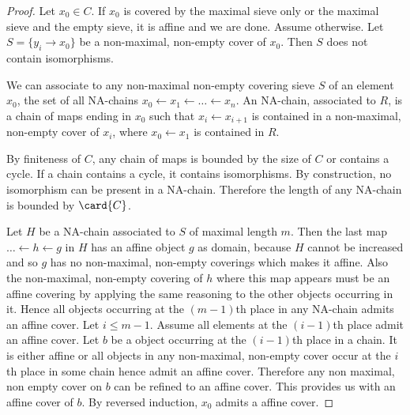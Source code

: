 \begin{proof}
Let $x_0\in C$. 
If $x_0$ is covered by the maximal sieve only or the maximal sieve and the empty sieve, it is affine and we are done. 
Assume otherwise.
Let $S = \{y_i \rightarrow x_0\}$ be a non-maximal, non-empty cover of $x_0$.
Then $S$ does not contain isomorphisms.

We can associate to any non-maximal non-empty covering sieve $S$ of an element $x_0$,
the set of all NA-chains $x_0\leftarrow x_1 \leftarrow \ldots \leftarrow x_n$.
An NA-chain, associated to $R$, is a chain of maps ending in $x_0$ such that $x_i \leftarrow x_{i+1}$ is contained in a non-maximal, 
non-empty cover of $x_i$, where $x_0\leftarrow x_1$ is contained in $R$.

By finiteness of $C$, any chain of maps is bounded by the size of $C$ or contains a cycle. 
If a chain contains a cycle, it contains isomorphisms. 
By construction, no isomorphism can be present in a NA-chain. 
Therefore the length of any NA-chain is bounded by $\card{C}$.

Let $H$ be a NA-chain associated to $S$ of maximal length $m$. 
Then the last map $\ldots \leftarrow h \leftarrow g$ in $H$ has an affine object $g$ as domain,
because $H$ cannot be increased and so $g$ has no non-maximal, non-empty coverings which makes it affine.
Also the non-maximal, non-empty covering of $h$ where this map appears must be an affine covering by applying the same reasoning to the other objects occurring in it. 
Hence all objects occurring at the $(m-1)$th place in any NA-chain admits an affine cover.
Let $i\leq m-1$. Assume all elements at the $(i-1)$th place admit an affine cover. 
Let $b$ be a object occurring at the $(i-1)$th place in a chain. It is either affine or all objects in any non-maximal, non-empty cover occur at the $i$th place in some chain hence admit an affine cover. Therefore any non maximal, non empty cover on $b$ can be refined to an affine cover. This provides us with an affine cover of $b$.
By reversed induction, $x_0$ admits a affine cover.
\end{proof}